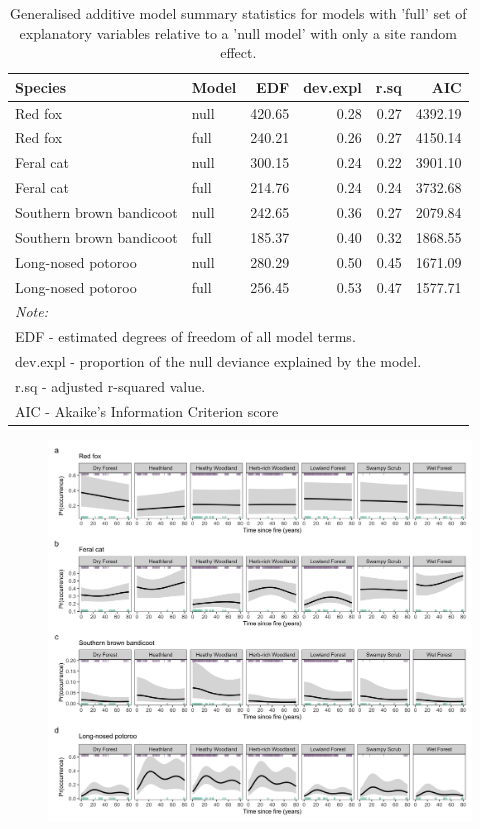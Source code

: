 \documentclass[11pt,a4paper,titlepage,twoside,openright]{style/unimelbthesis}
\begin{document}
\begin{mainmatter}
\begingroup\fontsize{10}{12}\selectfont
\begin{longtable}[t]{llrrrr}
\caption{\label{tab:occ-model-sumstats}Generalised additive model summary statistics for models with 'full' set of explanatory variables relative to a 'null model' with only a site random effect.}\\
\toprule
Species & Model & EDF & dev.expl & r.sq & AIC\\
\midrule
Red fox & null & 420.65 & 0.28 & 0.27 & 4392.19\\
Red fox & full & 240.21 & 0.26 & 0.27 & 4150.14\\
Feral cat & null & 300.15 & 0.24 & 0.22 & 3901.10\\
Feral cat & full & 214.76 & 0.24 & 0.24 & 3732.68\\
Southern brown bandicoot & null & 242.65 & 0.36 & 0.27 & 2079.84\\
\addlinespace
Southern brown bandicoot & full & 185.37 & 0.40 & 0.32 & 1868.55\\
Long-nosed potoroo & null & 280.29 & 0.50 & 0.45 & 1671.09\\
Long-nosed potoroo & full & 256.45 & 0.53 & 0.47 & 1577.71\\
\bottomrule
\multicolumn{6}{l}{\rule{0pt}{1em}\textit{Note: }}\\
\multicolumn{6}{l}{\rule{0pt}{1em}EDF - estimated degrees of freedom of all model terms.}\\
\multicolumn{6}{l}{\rule{0pt}{1em}dev.expl - proportion of the null deviance explained by the model. }\\
\multicolumn{6}{l}{\rule{0pt}{1em}r.sq -  adjusted r-squared value.}\\
\multicolumn{6}{l}{\rule{0pt}{1em}AIC - Akaike's Information Criterion score}\\
\end{longtable}
\endgroup{}

\newpage
\begin{figure}

{\centering \includegraphics[width=1\linewidth]{figure/tsf} 

}
\end{figure}
\end{mainmatter}
\end{document}
